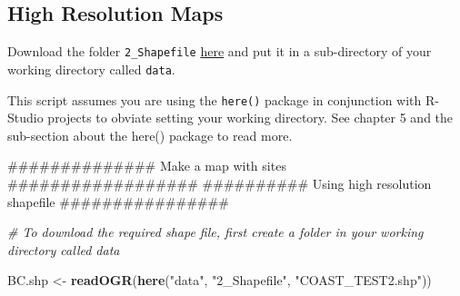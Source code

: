 \documentclass[]{book}
\newenvironment{Shaded}{\begin{snugshade}}{\end{snugshade}}
\newcommand{\KeywordTok}[1]{\textcolor[rgb]{0.13,0.29,0.53}{\textbf{#1}}}
\newcommand{\DataTypeTok}[1]{\textcolor[rgb]{0.13,0.29,0.53}{#1}}
\newcommand{\StringTok}[1]{\textcolor[rgb]{0.31,0.60,0.02}{#1}}
\newcommand{\CommentTok}[1]{\textcolor[rgb]{0.56,0.35,0.01}{\textit{#1}}}
\newcommand{\OtherTok}[1]{\textcolor[rgb]{0.56,0.35,0.01}{#1}}
\newcommand{\OperatorTok}[1]{\textcolor[rgb]{0.81,0.36,0.00}{\textbf{#1}}}
\newcommand{\AlertTok}[1]{\textcolor[rgb]{0.94,0.16,0.16}{#1}}
\newcommand{\NormalTok}[1]{#1}
\begin{document}
\begin{Shaded}
\end{Shaded}

\subsection{High Resolution Maps}\label{high-resolution-maps}

Download the folder \texttt{2\_Shapefile}
\href{https://drive.google.com/drive/folders/1GoEhACuGPGaQxn48ACkSc_qePx29TqC5?usp=sharing}{here}
and put it in a sub-directory of your working directory called
\texttt{data}.

This script assumes you are using the \texttt{here()} package in
conjunction with R-Studio projects to obviate setting your working
directory. See chapter 5 and the sub-section about the here() package to
read more.

\begin{Shaded}
\begin{Highlighting}[]
\NormalTok{############## Make a map with sites ################## }
\NormalTok{########## Using high resolution shapefile ################}

\CommentTok{# To download the required shape file, first create a folder in your working directory called data}


\NormalTok{BC.shp <-}\StringTok{ }\KeywordTok{readOGR}\NormalTok{(}\KeywordTok{here}\NormalTok{(}\StringTok{"data"}\NormalTok{, }\StringTok{"2_Shapefile"}\NormalTok{, }\StringTok{"COAST_TEST2.shp"}\NormalTok{))}
\end{Highlighting}
\end{Shaded}
\end{document}
